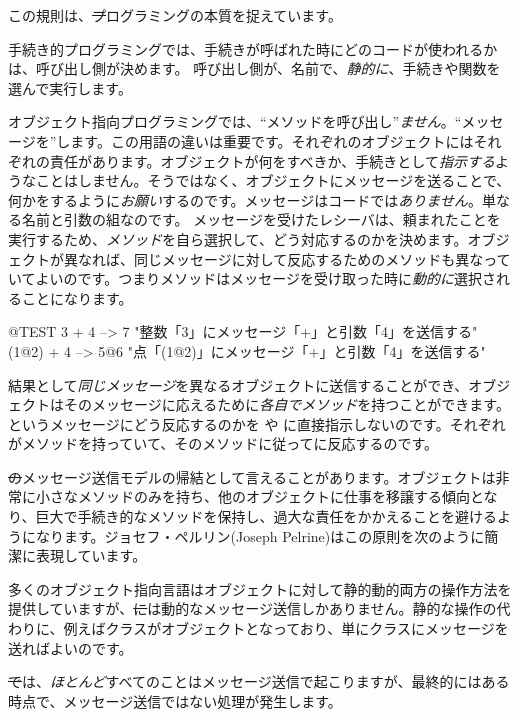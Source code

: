 \documentclass[a4paper,10pt,twoside]{book}
\begin{document}

この規則は、\st プログラミングの本質を捉えています。

手続き的プログラミングでは、手続きが呼ばれた時にどのコードが使われるかは、呼び出し側が決めます。
呼び出し側が、名前で、\emph{静的に}、手続きや関数を選んで実行します。

オブジェクト指向プログラミングでは、``メソッドを呼び出し''\emph{ません}。``メッセージを''します。この用語の違いは重要です。それぞれのオブジェクトにはそれぞれの責任があります。オブジェクトが何をすべきか、手続きとして\emph{指示する}ようなことはしません。そうではなく、オブジェクトにメッセージを送ることで、何かをするように\emph{お願い}するのです。メッセージはコードでは\emph{ありません}。単なる名前と引数の組なのです。
メッセージを受けたレシーバは、頼まれたことを実行するため、\emph{メソッド}を自ら選択して、どう対応するのかを決めます。オブジェクトが異なれば、同じメッセージに対して反応するためのメソッドも異なっていてよいのです。つまりメソッドはメッセージを受け取った時に\emph{動的に}選択されることになります。
\begin{code}{@TEST}
3 + 4         --> 7          "整数「3」にメッセージ「+」と引数「4」を送信する"
(1@2) + 4 --> 5@6    "点「(1@2)」にメッセージ「+」と引数「4」を送信する"
\end{code}
\noindent
結果として\emph{同じメッセージ}を異なるオブジェクトに送信することができ、オブジェクトはそのメッセージに応えるために\emph{各自でメソッド}を持つことができます。というメッセージにどう反応するのかを や に直接指示しないのです。それぞれが\ct{+}メソッドを持っていて、そのメソッドに従ってに反応するのです。

\st のメッセージ送信モデルの帰結として言えることがあります。オブジェクトは非常に小さなメソッドのみを持ち、他のオブジェクトに仕事を移譲する傾向となり、巨大で手続き的なメソッドを保持し、過大な責任をかかえることを避けるようになります。ジョセフ・ペルリン(Joseph Pelrine)はこの原則を次のように簡潔に表現しています。

多くのオブジェクト指向言語はオブジェクトに対して静的動的両方の操作方法を提供していますが、\st には動的なメッセージ送信しかありません。静的な操作の代わりに、例えばクラスがオブジェクトとなっており、単にクラスにメッセージを送ればよいのです。

\st では、\emph{ほとんど}すべてのことはメッセージ送信で起こりますが、最終的にはある時点で、メッセージ送信ではない処理が発生します。
\end{document}
